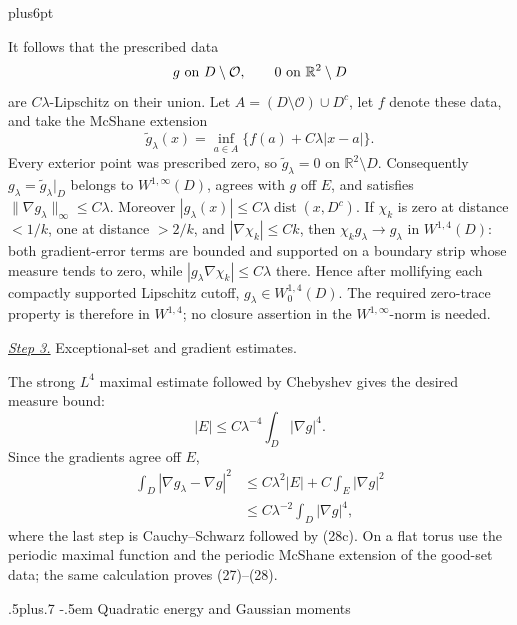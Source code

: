 \documentclass[11pt,reqno]{amsart}
\makeatletter
\def\subsection{\@startsection{subsection}{2}{0pt}%
  {.5\linespacing plus.7\linespacing}
  {-.5em}
  {\normalfont\scshape}}
\theoremstyle{plain}
\theoremstyle{definition}
\theoremstyle{remark}
\renewenvironment{proof}[1][\proofname]{%
  \par
  \pushQED{\qed}%
  \normalfont
  \topsep6pt plus6pt\relax
  \trivlist
  \item[\hskip\labelsep\slshape #1\@addpunct{.}]%
  \ignorespaces
}{%
  \popQED
  \endtrivlist
  \@endpefalse
}
\DeclareRobustCommand{\qed}{%
  \leavevmode\unskip\penalty9999\hbox{}\nobreak
  \ifmmode
    \makebox[0pt][l]{\qquad\hbox{\qedsymbol}}%
  \else
    \qquad\hbox{\qedsymbol}%
  \fi
}
\renewcommand{\qedsymbol}{\rule[.47pt]{4pt}{6pt}}
\numberwithin{equation}{section}
\newcommand{\1}{\mathbf 1}
\makeatother
\begin{document}
\begin{proof}
It follows that the prescribed data
\begin{equation*}
g\ \hbox{on }D\setminus\mathcal O,\qquad
0\ \hbox{on }\mathbb R^2\setminus D
\end{equation*}
are $C\lambda$-Lipschitz on their union.  Let
$A=(D\setminus\mathcal O)\cup D^c$, let $f$ denote these data, and
take the McShane extension
\begin{equation*}
\widetilde g_ \lambda(x)=\inf_ {a\in A}
\{f(a)+C\lambda|x-a|\}.
\end{equation*}
Every exterior point was prescribed zero, so
$\widetilde g_ \lambda=0$ on $\mathbb R^2\setminus D$.
Consequently $g_ \lambda=\widetilde g_ \lambda|_ D$ belongs to
$W^{1,\infty}(D)$, agrees with $g$ off $E$, and satisfies
$\|\nabla g_ \lambda\|_ \infty\leq C\lambda$.  Moreover
$|g_ \lambda(x)|\leq C\lambda\operatorname {dist}(x,D^c)$.
If $\chi_ k$ is zero at distance $<1/k$, one at distance $>2/k$,
and $|\nabla\chi_ k|\leq Ck$, then
$\chi_ kg_ \lambda\to g_ \lambda$ in $W^{1,4}(D)$: both gradient-error
terms are bounded and supported on a boundary strip whose measure tends
to zero, while $|g_ \lambda\nabla\chi_ k|\leq C\lambda$ there.  Hence
after mollifying each compactly supported Lipschitz cutoff,
$g_ \lambda\in W^{1,4}_ 0(D)$.  The required zero-trace property is
therefore in $W^{1,4}$; no closure assertion in the
$W^{1,\infty}$-norm is needed.

\smallskip\noindent
\underline{\textit{Step 3.}} Exceptional-set and gradient estimates.

The strong $L^4$ maximal estimate followed by Chebyshev gives the
desired measure bound:
\begin{equation}
|E|\leq C\lambda^{-4}\int_ D|\nabla g|^4.
\tag{28c}
\end{equation}
Since the gradients agree off $E$,
\begin{equation*}
\begin{split}
\int_ D|\nabla g_ \lambda-\nabla g|^2
&\leq C\lambda^2|E|+C\int_ E|\nabla g|^2\\
&\leq C\lambda^{-2}\int_ D|\nabla g|^4,
\end{split}
\end{equation*}
where the last step is Cauchy--Schwarz followed by (28c).  On a flat
torus use the periodic maximal function and the periodic McShane
extension of the good-set data; the same calculation proves (27)--(28).

\end{proof}

\subsection{Quadratic energy and Gaussian moments}
\end{document}
